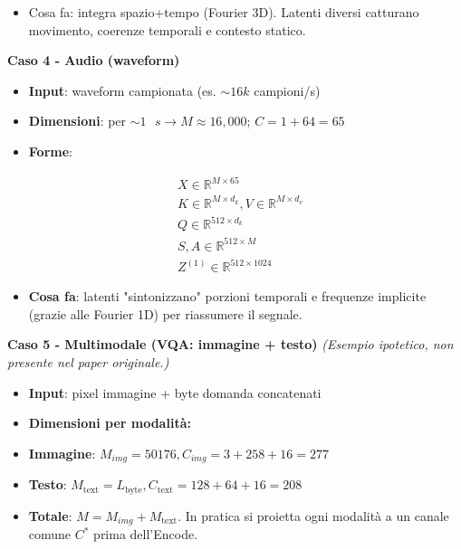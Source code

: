 \documentclass[
  11pt,
]{article}
\begin{document}
\begin{itemize}
\item
  Cosa fa: integra spazio+tempo (Fourier 3D). Latenti diversi catturano
  movimento, coerenze temporali e contesto statico.
\end{itemize}

\textbf{Caso 4 - Audio (waveform)}

\begin{itemize}
\item
  \textbf{Input}: waveform campionata (es. \(\sim 16k\) campioni/s)
\item
  \textbf{Dimensioni}: per
  \(\sim 1\text{ }s \rightarrow M \approx 16,000\); \(C = 1 + 64 = 65\)
\item
  \textbf{Forme}:
\end{itemize}

\[\begin{matrix}
 & X \in \mathbb{R}^{M \times 65} \\
 & K \in \mathbb{R}^{M \times d_{k}},V \in \mathbb{R}^{M \times d_{v}} \\
 & Q \in \mathbb{R}^{512 \times d_{k}} \\
 & S,A \in \mathbb{R}^{512 \times M} \\
 & Z^{(1)} \in \mathbb{R}^{512 \times 1024}
\end{matrix}\]

\begin{itemize}
\item
  \textbf{Cosa fa}: latenti "sintonizzano" porzioni temporali e
  frequenze implicite (grazie alle Fourier 1D) per riassumere il
  segnale.
\end{itemize}

\textbf{Caso 5 - Multimodale (VQA: immagine + testo)}
\emph{(Esempio ipotetico, non presente nel paper originale.)}

\begin{itemize}
\item
  \textbf{Input}: pixel immagine + byte domanda concatenati
\item
  \textbf{Dimensioni per modalità:}
\end{itemize}

\begin{itemize}
\item
  \textbf{Immagine}: \(M_{img} = 50176,C_{img} = 3 + 258 + 16 = 277\)
\item
  \textbf{Testo}:
  \(M_{\text{text}} = L_{\text{byte}},C_{\text{text}} = 128 + 64 + 16 = 208\)
\item
  \textbf{Totale}: \(M = M_{img} + M_{\text{text}}\). In pratica si
  proietta ogni modalità a un canale comune \(C^{*}\) prima
  dell'Encode.
\end{itemize}
\end{document}
